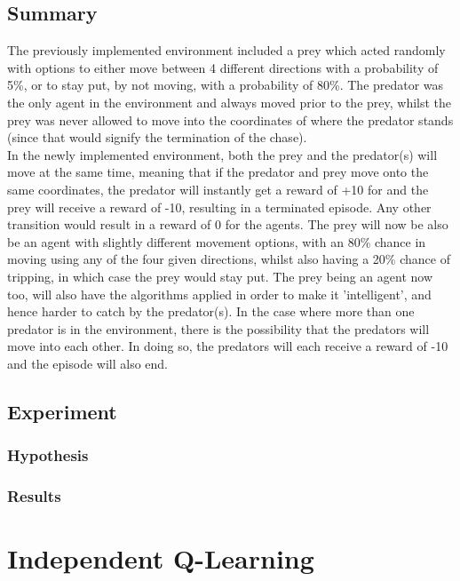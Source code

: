 \documentclass[a4paper,10pt]{article}
\begin{document}
\subsection{Summary}
The previously implemented environment included a prey which acted randomly with options to either move between 4 different directions with a probability of 5\%, or to stay put, by not moving, with a probability of 80\%. The predator was the only agent in the environment and always moved prior to the prey, whilst the prey was never allowed to move into the coordinates of where the predator stands (since that would signify the termination of the chase).\\
In the newly implemented environment, both the prey and the predator(s) will move at the same time, meaning that if the predator and prey move onto the same coordinates, the predator will instantly get a reward of +10 for and the prey will receive a reward of -10, resulting in a terminated episode. Any other transition would result in a reward of 0 for the agents.
The prey will now be also be an agent with slightly different movement options, with an 80\% chance in moving using any of the  four given directions, whilst also having a 20\% chance of tripping, in which case the prey would stay put. The prey being an agent now too, will also have the algorithms applied in order to make it 'intelligent', and hence harder to catch by the predator(s). 
In the case where more than one predator is in the environment, there is the possibility that the predators will move into each other. In doing so, the predators will each receive a reward of -10 and the episode will also end.

\subsection{Experiment}


\subsubsection{Hypothesis}


\subsubsection{Results}








\section{Independent Q-Learning}
\end{document}
